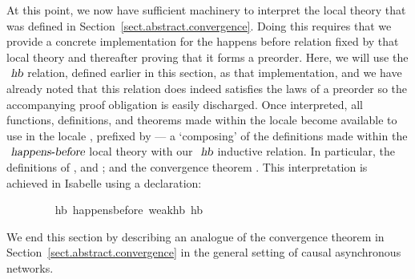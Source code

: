 \documentclass[acmlarge,review,anonymous]{acmart}\settopmatter{printfolios=true}
\begin{document}
At this point, we now have sufficient machinery to interpret the  local theory that was defined in Section~\ref{sect.abstract.convergence}.
Doing this requires that we provide a concrete implementation for the happens before relation fixed by that local theory and thereafter proving that it forms a preorder.
Here, we will use the $\isa{hb}$ relation, defined earlier in this section, as that implementation, and we have already noted that this relation does indeed satisfies the laws of a preorder so the accompanying proof obligation is easily discharged.
Once interpreted, all functions, definitions, and theorems made within the  locale become available to use in the locale , prefixed by --- a `composing' of the definitions made within the $\isa{happens-before}$ local theory with our $\isa{hb}$ inductive relation.
In particular, the definitions of ,  and ; and the convergence theorem .
This interpretation is achieved in Isabelle using a  declaration:
\\
\begin{isabellebody}
\ \ \ \ \ \ \ \  hb{\isacharcolon}\ happens{\isacharunderscore}before\ weak{\isacharunderscore}hb\ hb
\end{isabellebody}
\vspace{\baselineskip}
\noindent
We end this section by describing an analogue of the convergence theorem in Section~\ref{sect.abstract.convergence} in the general setting of causal asynchronous networks.
\end{document}
